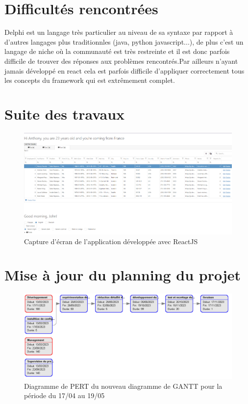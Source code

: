 \documentclass[a4paper, 12pt, french]{article}
\begin{document}
	\section{Difficultés rencontrées}
		Delphi est un langage très particulier au niveau de sa syntaxe par rapport à d'autres langages plus traditionnles (java, python javascript...), de plus c'est un langage de niche où la communauté est très restreinte et il est donc parfois difficile de trouver des réponses aux problèmes rencontrés.Par ailleurs n'ayant jamais développé en react cela est parfois difficile d'appliquer correctement tous les concepts du framework qui est extrêmement complet.

	\newpage

	\section{Suite des travaux}
		\begin{figure}[h!]
			\includegraphics[width=\linewidth]{mph_web_reactts_13_04_13_05.png}
			\caption{Capture d'écran de l'application développée avec ReactJS}
		\end{figure}

	\section{Mise à jour du planning du projet}
		\begin{figure}[h!]
			\includegraphics[width=\linewidth]{gantt_13_04_13_05.png}
			\caption{Diagramme de PERT du nouveau diagramme de GANTT pour la période du 17/04 au 19/05}
		\end{figure}
		
\end{document}
